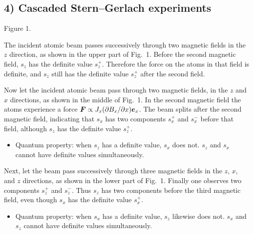 \subsection*{4) Cascaded Stern--Gerlach experiments}
\begin{center}
\par\smallskip Figure 1.
\end{center}
The incident atomic beam passes successively through two magnetic fields in the $z$ direction, as shown in the upper part of Fig.~1. Before the second magnetic field, $s_z$ has the definite value $s_z^+$. Therefore the force on the atoms in that field is definite, and $s_z$ still has the definite value $s_z^+$ after the second field.

Now let the incident atomic beam pass through two magnetic fields, in the $z$ and $x$ directions, as shown in the middle of Fig.~1. In the second magnetic field the atoms experience a force $\bm{F}\propto J_x(\partial B_x/\partial x)\bm{e}_x$. The beam splits after the second magnetic field, indicating that $s_x$ has two components $s_x^+$ and $s_x^-$ before that field, although $s_z$ has the definite value $s_z^+$.
\begin{itemize}\item Quantum property: when $s_z$ has a definite value, $s_x$ does not. $s_z$ and $s_x$ cannot have definite values simultaneously.\end{itemize}
Next, let the beam pass successively through three magnetic fields in the $z$, $x$, and $z$ directions, as shown in the lower part of Fig.~1. Finally one observes two components $s_z^+$ and $s_z^-$. Thus $s_z$ has two components before the third magnetic field, even though $s_x$ has the definite value $s_x^+$.
\begin{itemize}\item Quantum property: when $s_x$ has a definite value, $s_z$ likewise does not. $s_x$ and $s_z$ cannot have definite values simultaneously.\end{itemize}


